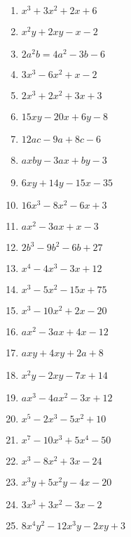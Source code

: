 \documentclass{article}
\begin{document}
\begin{enumerate}
\item $x^{3} + 3x^{2} + 2x + 6$
\item $x^{2}y + 2xy - x - 2$
\item $2a^{2}b = 4a^{2} - 3b - 6$
\item $3x^{3} - 6x^{2} + x - 2$
\item $2x^{3} + 2x^{2} + 3x + 3$
\item $15xy - 20x + 6y - 8$
\item $12ac - 9a + 8c - 6$
\item $axby - 3ax + by - 3$
\item $6xy + 14y - 15x - 35$
\item $16x^{3} - 8x^{2} - 6x + 3$
\item $ax^{2} - 3ax + x - 3$
\item $2b^{3} - 9b^{2} - 6b + 27$
\item $x^{4} - 4x^{3} - 3x + 12$
\item $x^{3} - 5x^{2} - 15x + 75$
\item $x^{3} - 10x^{2} + 2x - 20$
\item $ax^{2} - 3ax + 4x - 12$
\item $axy + 4xy + 2a + 8$
\item $x^{2}y - 2xy - 7x + 14$
\item $ax^{3} - 4ax^{2} - 3x + 12$
\item $x^{5} - 2x^{3} - 5x^{2} + 10$
\item $x^{7} - 10x^{3} + 5x^{4} - 50$
\item $x^{3} - 8x^{2} + 3x - 24$
\item $x^{3}y + 5x^{2}y - 4x - 20$
\item $3x^{3} + 3x^{2} - 3x - 2$
\item $8x^{4}y^{2} - 12x^{3}y - 2xy + 3$
\end{enumerate}
\end{document}
